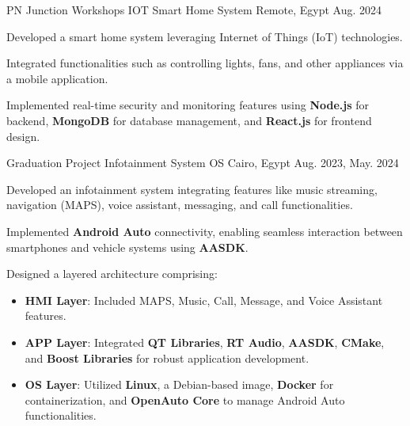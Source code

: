 \begin{cventries}
\cventry
{\normalsize PN Junction Workshops} %
{\Large IOT Smart Home System } %
{\normalsize Remote, Egypt} %
{\normalsize Aug. 2024 } %
{
  \begin{cvitems} %
    \item {Developed a smart home system leveraging Internet of Things (IoT) technologies.}
    \item {Integrated functionalities such as controlling lights, fans, and other appliances via a mobile application.}
    \item {Implemented real-time security and monitoring features using \textbf{Node.js} for backend, \textbf{MongoDB} for database management, and \textbf{React.js} for frontend design.}
  \end{cvitems}
}
\cventry
{\normalsize Graduation Project} %
{\Large Infotainment System OS} %
{\normalsize Cairo, Egypt } %
{\normalsize Aug. 2023, May. 2024} %
{
  \begin{cvitems} %
    \item {Developed an infotainment system integrating features like music streaming, navigation (MAPS), voice assistant, messaging, and call functionalities.}
    \item {Implemented \textbf{Android Auto} connectivity, enabling seamless interaction between smartphones and vehicle systems using \textbf{AASDK}.}
    \item {Designed a layered architecture comprising:
      \begin{itemize}
        \item \textbf{HMI Layer}: Included MAPS, Music, Call, Message, and Voice Assistant features.
        \item \textbf{APP Layer}: Integrated \textbf{QT Libraries}, \textbf{RT Audio}, \textbf{AASDK}, \textbf{CMake}, and \textbf{Boost Libraries} for robust application development.
        \item \textbf{OS Layer}: Utilized \textbf{Linux}, a Debian-based image, \textbf{Docker} for containerization, and \textbf{OpenAuto Core} to manage Android Auto functionalities.

\end{itemize}}
\end{cvitems}}
\end{cventries}
